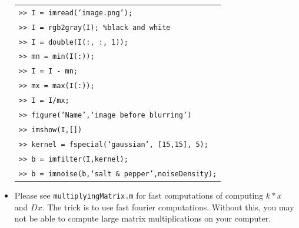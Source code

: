 \documentclass[12pt]{article}
\begin{document}
\begin{itemize}
\begin{tabular}{l}
\texttt{>> I = imread(`image.png');}\\
\texttt{>> I = rgb2gray(I); \quad \%black and white}\\
\texttt{>> I = double(I(:, :, 1));}\\
\texttt{>> mn = min(I(:));}\\
\texttt{>> I = I - mn;}\\
\texttt{>> mx = max(I(:));}\\
\texttt{>> I = I/mx;} \\
\texttt{>> figure(`Name',`image before blurring')}\\
\texttt{>> imshow(I,[])}\\
\texttt{>> kernel = fspecial(`gaussian', [15,15], 5);}\\
\texttt{>> b = imfilter(I,kernel);}\\  
\texttt{>> b = imnoise(b,`salt \& pepper',noiseDensity);}
\end{tabular}



\item Please see \texttt{multiplyingMatrix.m} for fast computations of computing $k * x$ and $D x$. The trick is to use fast fourier computations. Without this, you may not be able to compute large matrix multiplications on your computer. 


\end{itemize}
\end{document}
